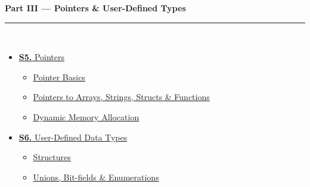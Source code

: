\documentclass[12pt,a3paper]{article}
\begin{document}
\begin{tcolorbox}[breakable,colback=cC!5,colframe=cC,boxrule=1pt,arc=5pt,
  left=8pt,right=8pt,top=8pt,bottom=8pt,before skip=4pt]
  {\large\bfseries\textcolor{cC}{Part III --- Pointers \& User-Defined Types}}\\[5pt]
  \textcolor{cC!40}{\rule{\textwidth}{0.4pt}}\\[3pt]
  \small\begin{itemize}[leftmargin=1.2em,itemsep=1pt,label={\textcolor{cC}{$\triangleright$}}]
    \item \hyperref[sec:S5]{\textbf{S5.} Pointers}
      \begin{itemize}[leftmargin=1.5em,itemsep=0pt,label={\textcolor{cC}{$\cdot$}}]
        \item \hyperref[sub:s5-ptrbasics]{Pointer Basics}
        \item \hyperref[sub:s5-ptradv]{Pointers to Arrays, Strings, Structs \& Functions}
        \item \hyperref[sub:s5-dynmem]{Dynamic Memory Allocation}
      \end{itemize}
    \item \hyperref[sec:S6]{\textbf{S6.} User-Defined Data Types}
      \begin{itemize}[leftmargin=1.5em,itemsep=0pt,label={\textcolor{cC}{$\cdot$}}]
        \item \hyperref[sub:s6-struct]{Structures}
        \item \hyperref[sub:s6-union]{Unions, Bit-fields \& Enumerations}
      \end{itemize}
  \end{itemize}
\end{tcolorbox}
\end{document}
